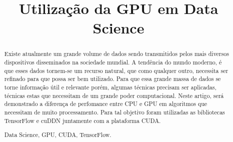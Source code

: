 \documentclass[conference]{IEEEtran}
\begin{document}
	\title{Utilização da GPU em Data Science}
	
	\author{
		\and
		\and
		}
	
	\maketitle
	
	\begin{abstract}
		
		Existe atualmente um grande volume de dados sendo transmitidos pelos mais diversos dispositivos disseminados na sociedade mundial. A tendência do mundo moderno, é que esses dados tornem-se um recurso natural, que como qualquer outro, necessita ser refinado para que possa ser bem utilizado. Para que essa grande massa de dados se torne informação útil e relevante porém, algumas técnicas precisam ser aplicadas, técnicas estas que necessitam de um grande poder computacional. Neste artigo, será demonstrado a diferença de perfomance entre CPU e GPU em algoritmos que necessitam de muito processamento. Para tal objetivo foram utilizadas as bibliotecas TensorFlow e cuDDN juntamente com a plataforma CUDA. 
		
		\begin{IEEEkeywords} Data Science, GPU, CUDA, TensorFlow. \end{IEEEkeywords}
	\end{abstract}
	
	
	
\end{document}
